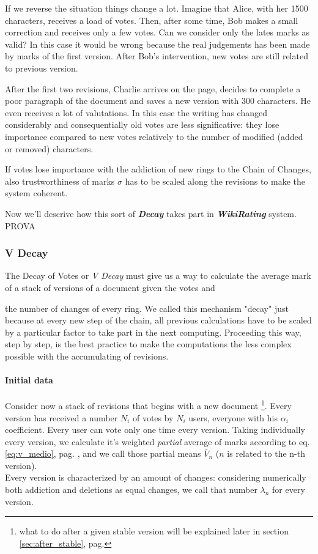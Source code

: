 \documentclass[a4paper,11pt]{article}
\newcommand{\wir}{\textbf{\textit{WikiRating }}}
\newcommand{\sg}{$\sigma$ }
\newcommand{\pb}[1]{$\bar{V}_#1$ }
\begin{document}
If we reverse the situation things change a lot. Imagine that Alice, with her 1500 
characters, receives a load of votes. Then, after some time, Bob makes a small correction 
and receives only a few votes. Can we consider only the lates marks as valid? In this case 
it would be wrong because the real judgements has been made by marks of the first 
version. After Bob's intervention, new votes are still related to previous version.

After the first two revisions, Charlie arrives on the page, decides to complete a poor 
paragraph of the document and saves a new version with 300 characters. He even receives a 
lot of valutations. In this case the writing has changed considerably and consequentially 
old votes are less significative: they lose importance compared to new votes relatively to 
the number of modified (added or removed) characters.

If votes lose importance with the addiction of new rings to the Chain of Changes, also 
trustworthiness of marks \sg has to be scaled along the revisions to make the system 
coherent. 

Now we'll descrive how this sort of \textit{\textbf{Decay}} takes part in \wir system.
PROVA

\subsubsection{V Decay} \label{sec:v_decay}
\begin{flushleft}
The Decay of Votes or \emph{V Decay} must give us a way to calculate the average mark of a 
stack of versions of a document given the votes and 
\end{flushleft}
the number of changes of every ring.
We called this mechanism "decay" just because at every new step of the chain, all previous 
calculations have to be scaled by a particular factor to take part in the next computing. 
Proceeding this way, step by step, is the best practice to make the computations the less 
complex possible with the accumulating of revisions.

\paragraph{Initial data} Consider now a stack of revisions that begins with a new document \footnote{what to do after a given stable version will be explained later in section \ref{sec:after_stable}, pag. \pageref{sec:after_stable}}. 
Every version has received a number $N_i$ of votes by $N_i$ users, everyone with his $
\alpha_i$ coefficient. Every user can vote only one time every version. Taking individually every version, we calculate it's weighted 
\emph{partial} average of marks according to eq. \ref{eq:v_medio}, pag. 
\pageref{eq:v_medio}, and we call those partial means \pb{n} ($n$ is related to the n-th version).\\
Every version is characterized by an amount of changes: considering numerically both 
addiction and deletions as equal changes, we call that number $\lambda_n$ for every 
version.
\end{document}
